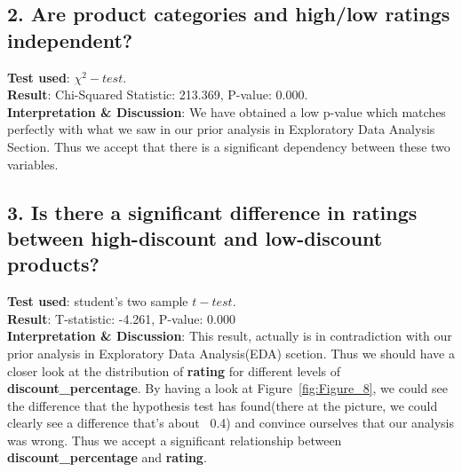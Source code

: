 \documentclass[a4paper,12pt]{article}
\begin{document}
\subsection*{2. Are product categories and high/low ratings independent?}

\noindent\textbf{Test used}: \( \chi^2-test\).\\ 

\noindent\textbf{Result}: Chi-Squared Statistic: 213.369, P-value: 0.000. \\ 

\noindent\textbf{Interpretation \& Discussion}: We have obtained a low p-value which matches perfectly with what we saw in our prior analysis in Exploratory Data Analysis Section. Thus we accept that there is a significant dependency between these two variables. \\ 

\subsection*{3. Is there a significant difference in ratings between high-discount and low-discount products?}

\noindent\textbf{Test used}: student's two sample \( t-test \).\\ 

\noindent\textbf{Result}: T-statistic: -4.261, P-value: 0.000 \\ 

\noindent\textbf{Interpretation \& Discussion}: This result, actually is in contradiction with our prior analysis in Exploratory Data Analysis(EDA) scetion. Thus we should have a closer look at the distribution of \textbf{rating} for different levels of \textbf{discount\_percentage}. By having a look at Figure~\ref{fig:Figure_8}, we could see the difference that the hypothesis test has found(there at the picture, we could clearly see a difference that's about ~0.4) and convince ourselves that our analysis was wrong. Thus we accept a significant relationship between \textbf{discount\_percentage} and \textbf{rating}. \\ 
\end{document}
